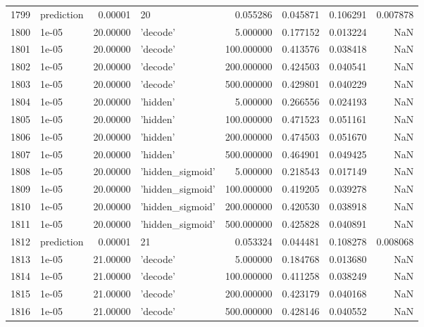 \documentclass[10pt,a4paper]{article}
\begin{document}
\begin{tabular}{llrlrrrr}
1799 &  prediction &   0.00001 &                 20 &    0.055286 &  0.045871 &  0.106291 &  0.007878 \\
1800 &       1e-05 &  20.00000 &           'decode' &    5.000000 &  0.177152 &  0.013224 &       NaN \\
1801 &       1e-05 &  20.00000 &           'decode' &  100.000000 &  0.413576 &  0.038418 &       NaN \\
1802 &       1e-05 &  20.00000 &           'decode' &  200.000000 &  0.424503 &  0.040541 &       NaN \\
1803 &       1e-05 &  20.00000 &           'decode' &  500.000000 &  0.429801 &  0.040229 &       NaN \\
1804 &       1e-05 &  20.00000 &           'hidden' &    5.000000 &  0.266556 &  0.024193 &       NaN \\
1805 &       1e-05 &  20.00000 &           'hidden' &  100.000000 &  0.471523 &  0.051161 &       NaN \\
1806 &       1e-05 &  20.00000 &           'hidden' &  200.000000 &  0.474503 &  0.051670 &       NaN \\
1807 &       1e-05 &  20.00000 &           'hidden' &  500.000000 &  0.464901 &  0.049425 &       NaN \\
1808 &       1e-05 &  20.00000 &   'hidden\_sigmoid' &    5.000000 &  0.218543 &  0.017149 &       NaN \\
1809 &       1e-05 &  20.00000 &   'hidden\_sigmoid' &  100.000000 &  0.419205 &  0.039278 &       NaN \\
1810 &       1e-05 &  20.00000 &   'hidden\_sigmoid' &  200.000000 &  0.420530 &  0.038918 &       NaN \\
1811 &       1e-05 &  20.00000 &   'hidden\_sigmoid' &  500.000000 &  0.425828 &  0.040891 &       NaN \\
1812 &  prediction &   0.00001 &                 21 &    0.053324 &  0.044481 &  0.108278 &  0.008068 \\
1813 &       1e-05 &  21.00000 &           'decode' &    5.000000 &  0.184768 &  0.013680 &       NaN \\
1814 &       1e-05 &  21.00000 &           'decode' &  100.000000 &  0.411258 &  0.038249 &       NaN \\
1815 &       1e-05 &  21.00000 &           'decode' &  200.000000 &  0.423179 &  0.040168 &       NaN \\
1816 &       1e-05 &  21.00000 &           'decode' &  500.000000 &  0.428146 &  0.040552 &       NaN \\

\end{tabular}
\end{document}
